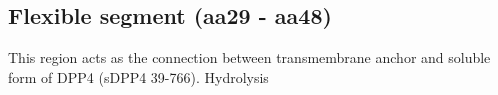 \subsection{Flexible segment (aa29 - aa48)}

This region acts as the connection between transmembrane anchor and soluble form of DPP4 (sDPP4 39-766). Hydrolysis 
